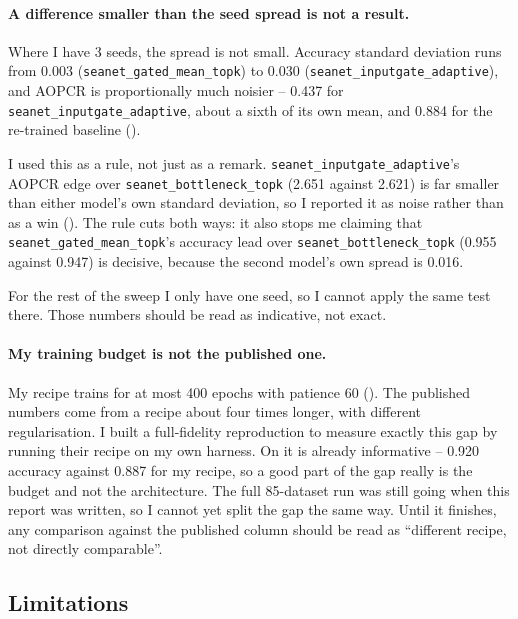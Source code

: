 \paragraph{A difference smaller than the seed spread is not a result.}
Where I have 3 seeds, the spread is not small. Accuracy standard deviation runs from 0.003
(\texttt{seanet\_gated\_mean\_topk}) to 0.030 (\texttt{seanet\_inputgate\_adaptive}), and AOPCR is
proportionally much noisier -- 0.437 for \texttt{seanet\_inputgate\_adaptive}, about a sixth of its
own mean, and 0.884 for the re-trained \millet{} baseline ().

I used this as a rule, not just as a remark. \texttt{seanet\_inputgate\_adaptive}'s AOPCR edge over
\texttt{seanet\_bottleneck\_topk} (2.651 against 2.621) is far smaller than either model's own
standard deviation, so I reported it as noise rather than as a win ().
The rule cuts both ways: it also stops me claiming that
\texttt{seanet\_gated\_mean\_topk}'s accuracy lead over \texttt{seanet\_bottleneck\_topk} (0.955
against 0.947) is decisive, because the second model's own spread is 0.016.

For the rest of the sweep I only have one seed, so I cannot apply the same test there. Those
numbers should be read as indicative, not exact.

\paragraph{My training budget is not the published one.}
My recipe trains for at most 400 epochs with patience 60 (). The published
\millet{} numbers come from a recipe about four times longer, with different regularisation. I built
a full-fidelity reproduction to measure exactly this gap by running their recipe on my own
harness. On \webtraffic{} it is already informative -- 0.920 accuracy against 0.887 for my recipe,
so a good part of the gap really is the budget and not the architecture. The full 85-dataset run was
still going when this report was written, so I cannot yet split the \ucr{} gap the same way. Until
it finishes, any comparison against the published column should be read as ``different recipe, not
directly comparable''.

\subsection{Limitations}
\label{sec:disc:limitations}


